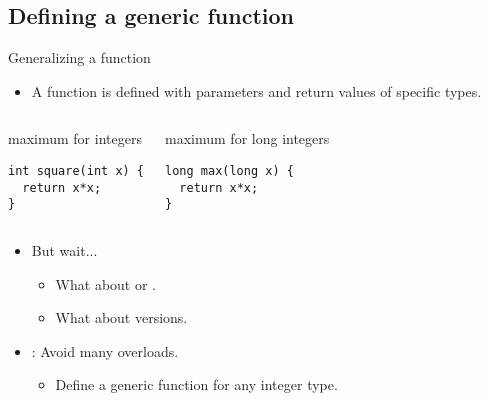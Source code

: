 \subsection{Defining a generic function}

\begin{frame}[t,fragile]{Generalizing a function}
\begin{itemize}
  \item A function is defined with parameters and return
        values of specific types.
\end{itemize}

\begin{columns}[T]

\begin{block}{maximum for integers}
\begin{lstlisting}
int square(int x) {
  return x*x;
}
\end{lstlisting}
\end{block}

\begin{block}{maximum for long integers}
\begin{lstlisting}
long max(long x) {
  return x*x;
}
\end{lstlisting}
\end{block}

\end{columns}

\begin{itemize}
  \item But wait...
    \begin{itemize}
      \item What about  or .
      \item What about  versions.
    \end{itemize}

  \item {}: Avoid many overloads.
    \begin{itemize}
      \item Define a generic function for any integer type.
    \end{itemize}
\end{itemize}

\end{frame}

